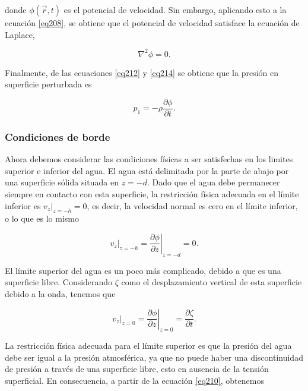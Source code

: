 \noindent donde $\phi(\vec{r},t)$ es el potencial de velocidad. Sin embargo, aplicando esto a la ecuación \ref{eq208}, se obtiene que el potencial de velocidad satisface la ecuación de Laplace,

\begin{equation}\label{eq215}
   \nabla^2 \phi = 0.
\end{equation}

\noindent Finalmente, de las ecuaciones \ref{eq212} y \ref{eq214} se obtiene que la presión en superficie perturbada es

\begin{equation}\label{eq216}
   p_1 = - \rho \frac{\partial \phi}{\partial t}.
\end{equation}


\subsubsection{Condiciones de borde}

Ahora debemos considerar las condiciones físicas a ser satisfechas en los limites superior e inferior del agua. El agua está delimitada por la parte de abajo por una superficie sólida situada en $z = -d$. Dado que el agua debe permanecer siempre en contacto con esta superficie, la restricción física adecuada en el límite inferior es $v_z|_{z=-h}= 0$, es decir, la velocidad normal es cero en el límite inferior, o lo que es lo mismo

\begin{equation} \label{eq217}
   v_z|_{z=-h} = \left. \frac{\partial \phi}{\partial z} \right|_{z=-d} = 0.
\end{equation}

El límite superior del agua es un poco más complicado, debido a que es una superficie libre. Considerando $\zeta$ como el desplazamiento vertical de esta superficie debido a la onda, tenemos que 

\begin{equation} \label{eq218}
   v_z|_{z=0} = \left. \frac{\partial \phi}{\partial z} \right|_{z=0} = \frac{\partial \zeta}{\partial t}.
\end{equation}

La restricción física adecuada para el límite superior es que la presión del agua debe ser igual a la presión atmosférica, ya que no puede haber una discontinuidad de presión a través de una superficie libre, esto en ausencia de la tensión superficial. En consecuencia, a partir de la ecuación \ref{eq210}, obtenemos

